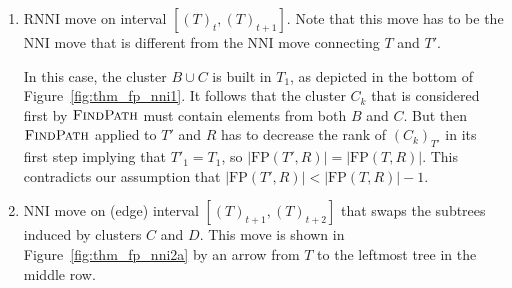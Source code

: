 \documentclass[11pt]{amsart}
\newcommand{\rnni}{\mathrm{RNNI}}
\newcommand{\findpath}{\textsc{FindPath}}
\newcommand{\nni}{\mathrm{NNI}}
\newcommand{\fp}{\mathrm{FP}}
\begin{document}
\begin{enumerate}[label = 1.{\arabic*}]
\item $\rnni$ move on interval $[(T)_t, (T)_{t+1}]$.
Note that this move has to be the $\nni$ move that is different from the $\nni$ move connecting $T$ and $T'$.

In this case, the cluster $B \cup C$ is built in $T_1$, as depicted in the bottom of Figure~\ref{fig:thm_fp_nni1}.
It follows that the cluster $C_k$ that is considered first by $\findpath$ must contain elements from both $B$ and $C$.
But then $\findpath$ applied to $T'$ and $R$ has to decrease the rank of $(C_k)_{T'}$ in its first step implying that $T'_1 = T_1$, so $|\fp(T',R)| = |\fp(T,R)|$.
This contradicts our assumption that $|\fp(T',R)| < |\fp(T,R)| - 1$.

\item $\nni$ move on (edge) interval $[(T)_{t+1}, (T)_{t+2}]$ that swaps the subtrees induced by clusters $C$ and $D$.
This move is shown in Figure~\ref{fig:thm_fp_nni2a} by an arrow from $T$ to the leftmost tree in the middle row.


\end{enumerate}
\end{document}
